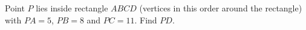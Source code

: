 Point $P$ lies inside rectangle $ABCD$ (vertices in this order around the rectangle) with $PA=5$, $PB=8$ and $PC=11$. Find $PD$.
